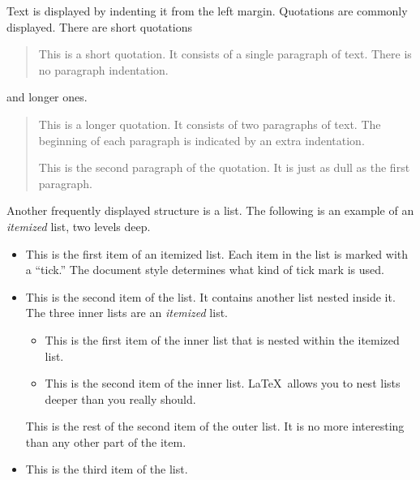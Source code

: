 \documentclass[aodsor,preprint]{imsart}
\numberwithin{equation}{section}
\theoremstyle{plain}
\begin{document}
Text is displayed by indenting it from the left margin.
Quotations are commonly displayed.  There are short quotations
\begin{quote}
   This is a short quotation.  It consists of a
   single paragraph of text.  There is no paragraph
   indentation.
\end{quote}
and longer ones.
\begin{quotation}
   This is a longer quotation.  It consists of two paragraphs
   of text.  The beginning of each paragraph is indicated
   by an extra indentation.

   This is the second paragraph of the quotation.  It is just
   as dull as the first paragraph.
\end{quotation}
Another frequently displayed structure is a list.
The following is an example of an {\em itemized} list,
two levels deep.
\begin{itemize}
\item  This is the first item of an itemized list.  Each item
      in the list is marked with a ``tick.''  The document
      style determines what kind of tick mark is used.
\item  This is the second item of the list.  It contains another
      list nested inside it.  The three inner lists are an {\em itemized}
      list.
    \begin{itemize}
       \item This is the first item of the inner list that
            is nested within the itemized list.
          \item This is the second item of the inner list.  \LaTeX\
            allows you to nest lists deeper than you really should.
      \end{itemize}
      This is the rest of the second item of the outer list.  It
      is no more interesting than any other part of the item.
   \item  This is the third item of the list.
\end{itemize}
\end{document}
